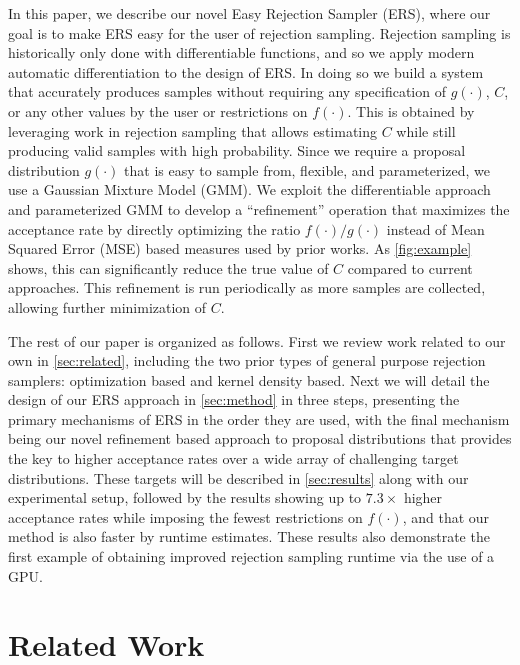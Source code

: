 \documentclass{ecai}  %
\begin{document}
In this paper, we describe our novel Easy Rejection Sampler (ERS), where our goal is to make ERS easy for the user of rejection sampling. Rejection sampling is historically only done with differentiable functions, and so we apply modern automatic differentiation to the design of ERS. In doing so we build a system that accurately produces samples without requiring any specification of $g(\cdot)$, $C$, or any other values by the user or restrictions on $f(\cdot)$. This is obtained by leveraging work in rejection sampling that allows estimating $C$ while still producing valid samples with high probability. Since we require a proposal distribution $g(\cdot)$ that is easy to sample from, flexible, and  parameterized, we use a Gaussian Mixture Model (GMM). We exploit the differentiable approach and parameterized GMM to develop a ``refinement'' operation that maximizes the acceptance rate by directly optimizing the ratio $f(\cdot)/g(\cdot)$ instead of Mean Squared Error (MSE) based measures used by prior works. As \autoref{fig:example} shows, this can significantly reduce the true value of $C$ compared to current approaches. This refinement is run periodically as more samples are collected, allowing further minimization of $C$. 

%
%
%
%
%
%
%
%
%
%
%
%
%
%
%
%
%
%
%
%
%
%


The rest of our paper is organized as follows. First we  review work related to our own in \autoref{sec:related}, including the two prior types of general purpose rejection samplers: optimization based and kernel density based. Next we will detail the design of our ERS approach in \autoref{sec:method} in three steps, presenting the primary mechanisms of ERS in the order they are used, with the final mechanism being our novel refinement based approach to proposal distributions that provides the key to higher acceptance rates over a wide array of challenging target distributions. These targets will be described in \autoref{sec:results} along with our experimental setup, followed by the results showing up to $7.3\times$ higher acceptance rates while imposing the fewest restrictions on $f(\cdot)$, and that our method is also faster by runtime estimates. These results also demonstrate the first example of obtaining improved rejection sampling runtime via the use of a GPU.
%

\section{Related Work} \label{sec:related}
\end{document}
